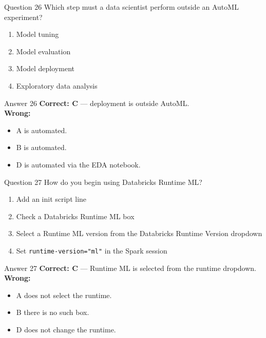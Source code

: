 \documentclass[aspectratio=169,11pt]{beamer}
\begin{document}
	\begin{frame}{Question 26}
		Which step must a data scientist perform outside an AutoML experiment?
		\begin{enumerate}[label=\Alph*.]
			\item Model tuning
			\item Model evaluation
			\item Model deployment
			\item Exploratory data analysis
		\end{enumerate}
	\end{frame}
	\begin{frame}{Answer 26}
		\textbf{Correct: C} --- deployment is outside AutoML.\\
		\vspace{0.5em}
		\textbf{Wrong:}
		\begin{itemize}
			\item A is automated.
			\item B is automated.
			\item D is automated via the EDA notebook.
		\end{itemize}
	\end{frame}
	
	\begin{frame}{Question 27}
		How do you begin using Databricks Runtime ML?
		\begin{enumerate}[label=\Alph*.]
			\item Add an init script line
			\item Check a Databricks Runtime ML box
			\item Select a Runtime ML version from the Databricks Runtime Version dropdown
			\item Set \texttt{runtime-version="ml"} in the Spark session
		\end{enumerate}
	\end{frame}
	\begin{frame}{Answer 27}
		\textbf{Correct: C} --- Runtime ML is selected from the runtime dropdown.\\
		\vspace{0.5em}
		\textbf{Wrong:}
		\begin{itemize}
			\item A does not select the runtime.
			\item B there is no such box.
			\item D does not change the runtime.
		\end{itemize}
	\end{frame}
	
\end{document}
